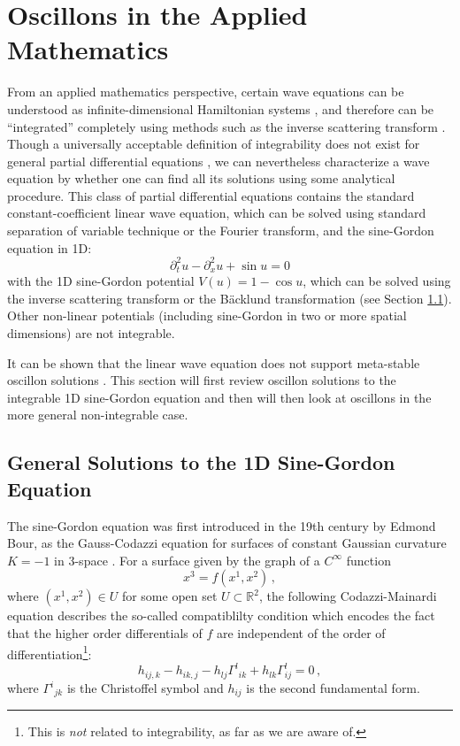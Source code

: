 \documentclass[11pt]{book}
\begin{document}
\section{Oscillons in the Applied Mathematics}\label{litrev:appm}
From an applied mathematics perspective, certain wave equations can be understood as infinite-dimensional Hamiltonian systems \cite{intsys}, and therefore can be ``integrated'' completely using methods such as the inverse scattering transform \cite{intsys, spiro, ablowitz}. Though a universally acceptable definition of integrability does not exist for general partial differential equations \cite{intsys}, we can nevertheless characterize a wave equation by whether one can find all its solutions using some analytical procedure. This class of partial differential equations contains the standard constant-coefficient linear wave equation, which can be solved using standard separation of variable technique or the Fourier transform, and the sine-Gordon equation in 1D:
\begin{equation}
  \partial^2_t u - \partial^2_x u + \sin u = 0
\end{equation}
with the 1D sine-Gordon potential $V(u) = 1-\cos u$, which can be solved using the inverse scattering transform or the B\"acklund transformation (see Section \ref{litrev:gensolsg1d}). Other non-linear potentials (including sine-Gordon in two or more spatial dimensions) are not integrable.

It can be shown that the linear wave equation does not support meta-stable oscillon solutions \cite{Copeland:1995fq}. This section will first review oscillon solutions to the integrable 1D sine-Gordon equation and then will then look at oscillons in the more general non-integrable case.

\subsection{General Solutions to the 1D Sine-Gordon Equation}\label{litrev:gensolsg1d}

The sine-Gordon equation was first introduced in the 19th century by Edmond Bour, as the Gauss-Codazzi equation for surfaces of constant Gaussian curvature $K=-1$ in 3-space \cite{bour}. For a surface given by the graph of a $C^\infty$ function
\begin{equation}
  x^3 = f(x^1, x^2)\,,
\end{equation}
where $(x^1,x^2)\in U$ for some open set $U\subset \mathbb{R}^2$, the following Codazzi-Mainardi equation describes the so-called compatiblilty condition which encodes the fact that the higher order differentials of $f$ are independent of the order of differentiation\footnote{This is \emph{not} related to integrability, as far as we are aware of.}:
\begin{equation}\label{codazzi}
  h_{ij,k} - h_{ik,j} - h_{lj}\Gamma ^l{}_{ik} + h_{lk}\Gamma^l_{ij}=0\,,
\end{equation}
where $\Gamma^i{}_{jk}$ is the Christoffel symbol and $h_{ij}$ is the second fundamental form.
\end{document}
